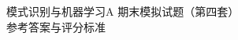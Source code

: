 
\geometry{left=2.4cm,right=2.4cm}
\renewcommand{\coursename}{模式识别与机器学习A\quad 期末模拟试题（第四套）参考答案与评分标准}
\fancyfootoffset[L]{0pt}

\begin{center}
{\LARGE\heiti 模式识别与机器学习A 期末模拟试题（第四套）}\\[4pt]
{\Large\heiti 参考答案与评分标准}
\end{center}


